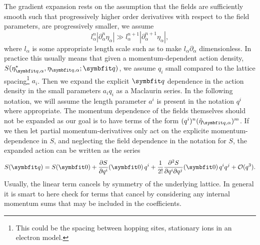 The gradient expansion rests on the assumption that the fields are sufficiently smooth such that progressively higher order derivatives with
respect to the field parameters, are progressively smaller,
\ie we assume 
\begin{equation}
    \label{eq:Field:Grad:gradientComparison}
    l_\alpha^n|\partial_\alpha^n\eta_\alpha| \gg l_\alpha^{n+1}|\partial_\alpha^{n+1}\eta_\alpha|,
\end{equation}
where $l_\alpha$ is some appropriate length scale such as to make $l_\alpha\partial_\alpha$ dimensionless.
In practice this usually means that given a momentum-dependent action density, $S(\eta_{\v{q},\alpha}^\ast,\eta_{\v{q},\alpha};\v{q})$, we assume $q_i$ small compared to the lattice
spacing\footnote{This could be the spacing between hopping sites, \ie stationary ions in an electron model.} $a_i$. Then we expand the
explicit $\v{q}$ dependence in the action density in the small parameters $a_iq_i$ as a Maclaurin series. In the following notation, we will
assume the length parameter $a^i$ is present in the notation $q^i$ where appropriate. The momentum dependence of the fields
themselves should not be expanded as our goal is to have terms of the form $(q^i)^n(\tilde{\eta}_{\v{q},\alpha})^m$. If we then let partial momentum-derivatives
only act on the explicite momentum-dependence in $S$, and neglecting the field dependence in the notation
for $S$, the expanded action can be written as the series
\begin{equation}
    \label{eq:Field:Grad:actionExpansion}
    S(\v{q}) = S(\v{0}) + \frac{\partial S}{\partial q^i}(\v{0})\,q^i + \frac{1}{2!}\frac{\partial^2S}{\partial q^i\partial q^j}(\v{0})\,q^iq^j + \mathcal{O}(q^3).
\end{equation}
Usually, the linear term cancels by symmetry of the underlying lattice. In general it is smart to here check for terms that cancel by considering any internal
momentum sums that may be included in the coefficients.

